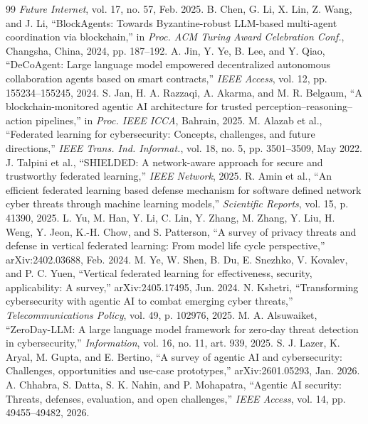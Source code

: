 \documentclass[10pt, conference]{IEEEtran}
\begin{document}
\begin{thebibliography}{99}
\textit{Future Internet}, vol. 17, no. 57, Feb. 2025.
B. Chen, G. Li, X. Lin, Z. Wang, and J. Li,
``BlockAgents: Towards Byzantine-robust LLM-based multi-agent coordination via blockchain,''
in \textit{Proc. ACM Turing Award Celebration Conf.}, Changsha, China, 2024, pp. 187--192.
A. Jin, Y. Ye, B. Lee, and Y. Qiao,
``DeCoAgent: Large language model empowered decentralized autonomous collaboration agents based on smart contracts,''
\textit{IEEE Access}, vol. 12, pp. 155234--155245, 2024.
S. Jan, H. A. Razzaqi, A. Akarma, and M. R. Belgaum,
``A blockchain-monitored agentic AI architecture for trusted perception--reasoning--action pipelines,''
in \textit{Proc. IEEE ICCA}, Bahrain, 2025.
M. Alazab et al.,
``Federated learning for cybersecurity: Concepts, challenges, and future directions,''
\textit{IEEE Trans. Ind. Informat.}, vol. 18, no. 5, pp. 3501--3509, May 2022.
J. Talpini et al.,
``SHIELDED: A network-aware approach for secure and trustworthy federated learning,''
\textit{IEEE Network}, 2025.
R. Amin et al.,
``An efficient federated learning based defense mechanism for software defined network cyber threats through machine learning models,''
\textit{Scientific Reports}, vol. 15, p. 41390, 2025.
L. Yu, M. Han, Y. Li, C. Lin, Y. Zhang, M. Zhang, Y. Liu, H. Weng, Y. Jeon, K.-H. Chow, and S. Patterson,
``A survey of privacy threats and defense in vertical federated learning: From model life cycle perspective,''
arXiv:2402.03688, Feb. 2024.
M. Ye, W. Shen, B. Du, E. Snezhko, V. Kovalev, and P. C. Yuen,
``Vertical federated learning for effectiveness, security, applicability: A survey,''
arXiv:2405.17495, Jun. 2024.
N. Kshetri,
``Transforming cybersecurity with agentic AI to combat emerging cyber threats,''
\textit{Telecommunications Policy}, vol. 49, p. 102976, 2025.
M. A. Alsuwaiket,
``ZeroDay-LLM: A large language model framework for zero-day threat detection in cybersecurity,''
\textit{Information}, vol. 16, no. 11, art. 939, 2025.
S. J. Lazer, K. Aryal, M. Gupta, and E. Bertino,
``A survey of agentic AI and cybersecurity: Challenges, opportunities and use-case prototypes,''
arXiv:2601.05293, Jan. 2026.
A. Chhabra, S. Datta, S. K. Nahin, and P. Mohapatra,
``Agentic AI security: Threats, defenses, evaluation, and open challenges,''
\textit{IEEE Access}, vol. 14, pp. 49455--49482, 2026.

\end{thebibliography}
\end{document}
